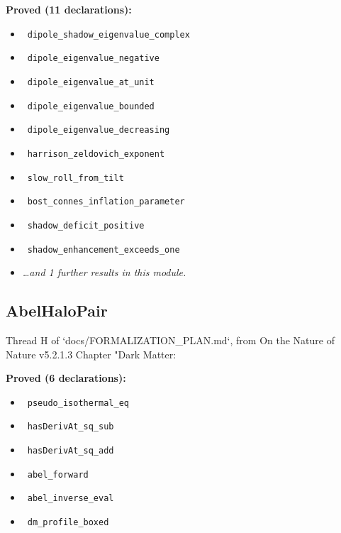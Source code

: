 \documentclass{report}
\theoremstyle{definition}
\begin{document}
\begin{itemize}
\begin{itemize}
\noindent\textbf{Proved (11 declarations):}
\begin{itemize}
  \item {}\leanok\ \texttt{dipole\_shadow\_eigenvalue\_complex}
  \item {}\leanok\ \texttt{dipole\_eigenvalue\_negative}
  \item {}\leanok\ \texttt{dipole\_eigenvalue\_at\_unit}
  \item {}\leanok\ \texttt{dipole\_eigenvalue\_bounded}
  \item {}\leanok\ \texttt{dipole\_eigenvalue\_decreasing}
  \item {}\leanok\ \texttt{harrison\_zeldovich\_exponent}
  \item {}\leanok\ \texttt{slow\_roll\_from\_tilt}
  \item {}\leanok\ \texttt{bost\_connes\_inflation\_parameter}
  \item {}\leanok\ \texttt{shadow\_deficit\_positive}
  \item {}\leanok\ \texttt{shadow\_enhancement\_exceeds\_one}
  \item \emph{\ldots and 1 further results in this module.}
\end{itemize}

\subsection{AbelHaloPair}
Thread H of `docs/FORMALIZATION\_PLAN.md`, from On the Nature of Nature v5.2.1.3 Chapter "Dark Matter:

\noindent\textbf{Proved (6 declarations):}
\begin{itemize}
  \item {}\leanok\ \texttt{pseudo\_isothermal\_eq}
  \item {}\leanok\ \texttt{hasDerivAt\_sq\_sub}
  \item {}\leanok\ \texttt{hasDerivAt\_sq\_add}
  \item {}\leanok\ \texttt{abel\_forward}
  \item {}\leanok\ \texttt{abel\_inverse\_eval}
  \item {}\leanok\ \texttt{dm\_profile\_boxed}
\end{itemize}


\end{itemize}
\end{itemize}
\end{document}
